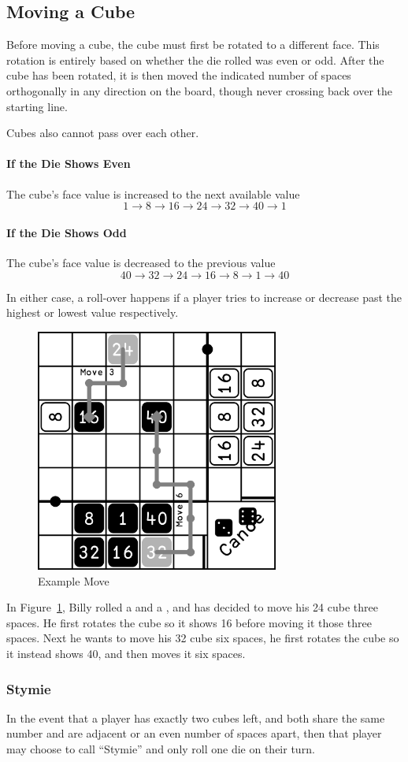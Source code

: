 \subsection{Moving a Cube}
Before moving a cube, the cube must first be rotated to a different face.
This rotation is entirely based on whether the die rolled was even or odd.
After the cube has been rotated, it is then moved the indicated number of spaces orthogonally in any direction on the board, though never crossing back over the starting line.

Cubes also cannot pass over each other.

\paragraph{If the Die Shows Even} The cube's face value is increased to the next available value
$$1 \to 8 \to 16 \to 24 \to 32 \to 40 \to 1$$
\paragraph{If the Die Shows Odd} The cube's face value is decreased to the previous value
$$40 \to 32 \to 24 \to 16 \to 8 \to 1 \to 40$$

\note In either case, a roll-over happens if a player tries to increase or decrease past the highest or lowest value respectively.

\begin{figure}[!h]
    \centering
    \includegraphics[width=8cm]{../graphics/movement}
    \caption{Example Move}
    \label{fig:move}
\end{figure}

\example In Figure~\ref{fig:move}, Billy rolled a  and a , and has decided to move his 24 cube three spaces. 
He first rotates the cube so it shows 16 before moving it those three spaces. 
Next he wants to move his 32 cube six spaces, he first rotates the cube so it instead shows 40, and then moves it six spaces.

\subsubsection{Stymie}
In the event that a player has exactly two cubes left, and both share the same number and are adjacent or an even number of spaces apart, then that player may choose to call ``Stymie'' and only roll one die on their turn.